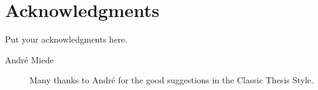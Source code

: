 \chapter*{Acknowledgments}
Put your acknowledgments here.

\begin{description}
	\item[André Miede] Many thanks to André for the good suggestions in the Classic Thesis Style.
\end{description}
